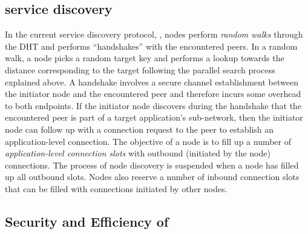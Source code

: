 \subsection{\discv service discovery}
\label{sec:background:discv4}
In the current service discovery protocol, \discv, nodes perform \textit{random walks} through the DHT and performs ``handshakes'' with the encountered peers.
In a random walk, a node picks a random target key and performs a lookup towards the distance corresponding to the target following the parallel search process explained above. 
A handshake involves a secure channel establishment between the initiator node and the encountered peer and therefore incurs some overhead to both endpoints. If the initiator node discovers during the handshake that the encountered peer is part of a target application's sub-network, then the initiator node can follow up with a connection request to the peer to establish an application-level connection. The objective of a node is to fill up a number of \textit{application-level connection slots} with outbound (\ie initiated by the node) connections. The process of node discovery is suspended when a node has filled up all outbound slots. Nodes also reserve a number of inbound connection slots that can be filled with connections initiated by other nodes. 

\subsection{Security and Efficiency of \discv}
\label{sec:securityEfficiency}

